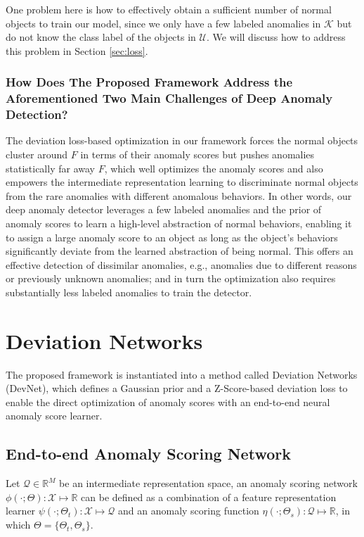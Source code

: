 \documentclass[sigconf]{acmart}
\begin{document}
One problem here is how to effectively obtain a sufficient number of normal objects to train our model, since we only have a few labeled anomalies in $\mathcal{K}$ but do not know the class label of the objects in $\mathcal{U}$. We will discuss how to address this problem in Section \ref{sec:loss}.

\subsubsection{How Does The Proposed Framework Address the Aforementioned Two Main Challenges of Deep Anomaly Detection?}

The deviation loss-based optimization in our framework forces the normal objects cluster around $F$ in terms of their anomaly scores but pushes anomalies statistically far away $F$, which well optimizes the anomaly scores and also empowers the intermediate representation learning to discriminate normal objects from the rare anomalies with different anomalous behaviors. In other words, our deep anomaly detector leverages a few labeled anomalies and the prior of anomaly scores to learn a high-level abstraction of normal behaviors, enabling it to assign a large anomaly score to an object as long as the object's behaviors significantly deviate from the learned abstraction of being normal. This offers an effective detection of dissimilar anomalies, e.g., anomalies due to different reasons or previously unknown anomalies; and in turn the optimization also requires substantially less labeled anomalies to train the detector.



\section{Deviation Networks}

The proposed framework is instantiated into a method called Deviation Networks (DevNet), which defines a Gaussian prior and a Z-Score-based deviation loss to enable the direct optimization of anomaly scores with an end-to-end neural anomaly score learner.

\subsection{End-to-end Anomaly Scoring Network}
Let $\mathcal{Q} \in \mathbb{R}^{M}$ be an intermediate representation space, an anomaly scoring network $\phi(\cdot; \Theta):\mathcal{X} \mapsto \mathbb{R}$ can be defined as a combination of a feature representation learner $\psi(\cdot; \Theta_{t}): \mathcal{X} \mapsto \mathcal{Q}$ and an anomaly scoring function $\eta(\cdot; \Theta_{s}): \mathcal{Q} \mapsto \mathbb{R}$, in which $\Theta=\{\Theta_{t}, \Theta_{s}\}$. 
\end{document}
